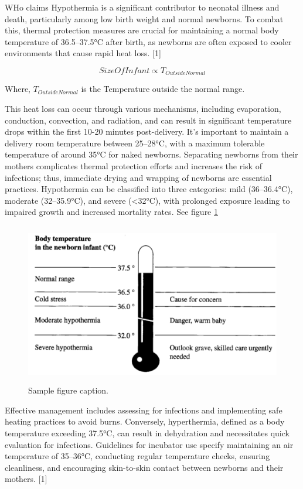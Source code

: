 \documentclass{article}
\begin{document}
WHo claims Hypothermia is a significant contributor to neonatal illness
and death, particularly among low birth weight and normal newborns. To
combat this, thermal protection measures are crucial for maintaining a
normal body temperature of 36.5--37.5°C after birth, as newborns are
often exposed to cooler environments that cause rapid heat loss. {[}1{]}

\[
SizeOfInfant \propto T_{OutsideNormal}
\]

Where, \(T_{OutsideNormal}\) is the Temperature outside the normal
range.

This heat loss can occur through various mechanisms, including
evaporation, conduction, convection, and radiation, and can result in
significant temperature drops within the first 10-20 minutes
post-delivery. It's important to maintain a delivery room temperature
between 25--28°C, with a maximum tolerable temperature of around 35°C
for naked newborns. Separating newborns from their mothers complicates
thermal protection efforts and increases the risk of infections; thus,
immediate drying and wrapping of newborns are essential practices.
Hypothermia can be classified into three categories: mild (36--36.4°C),
moderate (32--35.9°C), and severe (\textless32°C), with prolonged
exposure leading to impaired growth and increased mortality rates. See
figure \ref{fig:fig3}

\begin{figure}
  \centering
  \includegraphics[width=350pt,height=200pt]{images/clipboard-2554530258.png} %
  \caption{Sample figure caption.}
  \label{fig:fig3}
\end{figure}

Effective management includes assessing for infections and implementing
safe heating practices to avoid burns. Conversely, hyperthermia, defined
as a body temperature exceeding 37.5°C, can result in dehydration and
necessitates quick evaluation for infections. Guidelines for incubator
use specify maintaining an air temperature of 35--36°C, conducting
regular temperature checks, ensuring cleanliness, and encouraging
skin-to-skin contact between newborns and their mothers. {[}1{]}
\end{document}
